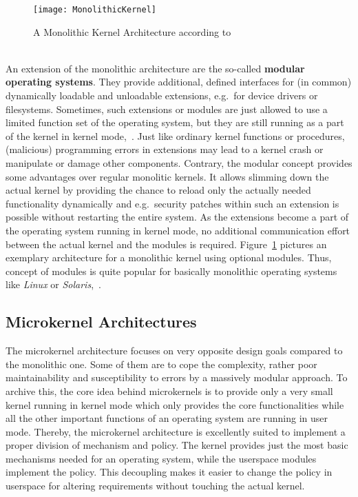 \begin{figure} [ht]
	\centering
	\texttt{[image: MonolithicKernel]}
	\caption{A Monolithic Kernel Architecture according to~\cite{lfd430}}\label{pic:monolith}
\end{figure} \ \\
%
An extension of the monolithic architecture are the so-called \textbf{modular operating systems}.
They provide additional, defined interfaces for (in common) dynamically loadable and unloadable extensions, e.g.\ for device drivers or filesystems. 
Sometimes, such extensions or modules are just allowed to use a limited function set of the operating system, but they are still running as a part of the kernel in kernel mode\cite{lfd430},~\cite{tanenbaum-modern-operating-systems}. 
Just like ordinary kernel functions or procedures, (malicious) programming errors in extensions may lead to a kernel crash or manipulate or damage other components.
Contrary, the modular concept provides some advantages over regular monolitic kernels.
It allows slimming down the actual kernel by providing the chance to reload only the actually needed functionality dynamically and e.g.\ security patches within such an extension is possible without restarting the entire system\cite{brause2017betriebssysteme}.
As the extensions become a part of the operating system running in kernel mode, no additional communication effort between the actual kernel and the modules is required.
Figure~\ref{pic:monolith} pictures an exemplary architecture for a monolithic kernel using optional modules.
Thus, concept of modules is quite popular for basically monolithic operating systems like \textit{Linux} or \textit{Solaris}\cite{brause2017betriebssysteme},~\cite{silberschatz2009operating}.

\subsection{Microkernel Architectures}\label{sec:microkernel-archs}
The microkernel architecture focuses on very opposite design goals compared to the monolithic one. 
Some of them are to cope the complexity, rather poor maintainability and susceptibility to errors by a massively modular approach. 
To archive this, the core idea behind microkernels is to provide only a very small kernel running in kernel mode which only provides the core functionalities while all the other important functions of an operating system are running in user mode.
Thereby, the microkernel architecture is excellently suited to implement a proper division of mechanism and policy.
The kernel provides just the most basic mechanisms needed for an operating system, while the userspace modules implement the policy.
This decoupling makes it easier to change the policy in userspace for altering requirements without touching the actual kernel\cite{tanenbaum-modern-operating-systems}.

